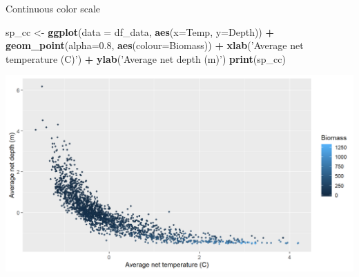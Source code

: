 \documentclass[
  ignorenonframetext,
]{beamer}
\newenvironment{Shaded}{\begin{snugshade}}{\end{snugshade}}
\newcommand{\DataTypeTok}[1]{\textcolor[rgb]{0.13,0.29,0.53}{#1}}
\newcommand{\FloatTok}[1]{\textcolor[rgb]{0.00,0.00,0.81}{#1}}
\newcommand{\KeywordTok}[1]{\textcolor[rgb]{0.13,0.29,0.53}{\textbf{#1}}}
\newcommand{\NormalTok}[1]{#1}
\newcommand{\OperatorTok}[1]{\textcolor[rgb]{0.81,0.36,0.00}{\textbf{#1}}}
\newcommand{\StringTok}[1]{\textcolor[rgb]{0.31,0.60,0.02}{#1}}
\begin{document}
\begin{frame}[fragile]{Continuous color scale}
\protect\hypertarget{continuous-color-scale}{}

\begin{Shaded}
\begin{Highlighting}[]
\NormalTok{sp_cc <-}\StringTok{ }\KeywordTok{ggplot}\NormalTok{(}\DataTypeTok{data =}\NormalTok{ df_data, }\KeywordTok{aes}\NormalTok{(}\DataTypeTok{x=}\NormalTok{Temp, }\DataTypeTok{y=}\NormalTok{Depth)) }\OperatorTok{+}
\StringTok{  }\KeywordTok{geom_point}\NormalTok{(}\DataTypeTok{alpha=}\FloatTok{0.8}\NormalTok{, }\KeywordTok{aes}\NormalTok{(}\DataTypeTok{colour=}\NormalTok{Biomass)) }\OperatorTok{+}\StringTok{ }
\StringTok{  }\KeywordTok{xlab}\NormalTok{(}\StringTok{'Average net temperature (C)'}\NormalTok{) }\OperatorTok{+}\StringTok{ }\KeywordTok{ylab}\NormalTok{(}\StringTok{'Average net depth (m)'}\NormalTok{)}
\KeywordTok{print}\NormalTok{(sp_cc)}
\end{Highlighting}
\end{Shaded}

\begin{center}\includegraphics[width=0.8\linewidth]{figure/sp_continuous_color1-1} \end{center}

\end{frame}
\end{document}
